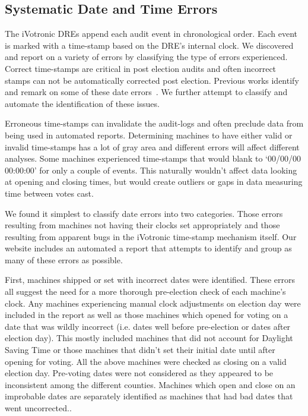 \subsection{Systematic Date and Time Errors}\label{an:date}
The iVotronic DREs append each audit event in chronological order.  Each event is marked with a time-stamp based on the DRE's internal clock.  We discovered and report on a variety of errors by classifying the type of errors experienced. Correct time-stamps are critical in post election audits and often incorrect stamps can not be automatically corrected post election.  Previous works identify and remark on some of these date errors~\cite{Buell2011,Sandler2007}.  We further attempt to classify and automate the identification of these issues.

Erroneous time-stamps can invalidate the audit-logs and often preclude data from being used in automated reports.  Determining machines to have either valid or invalid time-stamps has a lot of gray area and different errors will affect different analyses.  Some machines experienced time-stamps that would blank to \textquoteleft 00/00/00 00:00:00' for only a couple of events.  This naturally wouldn't affect data looking at opening and closing times, but would create outliers or gaps in data measuring time between votes cast.  

We found it simplest to classify date errors into two categories.  Those errors resulting from machines not having their clocks set appropriately and those resulting from apparent bugs in the iVotronic time-stamp mechanism itself.  Our website includes an automated a report that attempts to identify and group as many of these errors as possible.

First, machines shipped or set with incorrect dates were identified.  These errors all suggest the need for a more thorough pre-election check of each machine's clock.   Any machines experiencing manual clock adjustments on election day were included in the report as well as those machines which opened for voting on a date that was wildly incorrect (i.e. dates well before pre-election or dates after election day). This mostly included machines that did not account for Daylight Saving Time or  those machines that didn't set their initial date until after opening for voting.  All the above machines were checked as closing on a valid election day.  Pre-voting dates were not considered as they appeared to be inconsistent among the different counties. Machines which open and close on an improbable dates are separately identified as machines that had bad dates that went uncorrected..  

